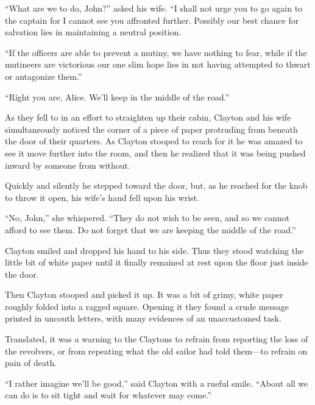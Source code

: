 “What are we to do, John?” asked his wife. “I shall not urge you to go again to the captain for I cannot see you affronted further. Possibly our best chance for salvation lies in maintaining a neutral position.

“If the officers are able to prevent a mutiny, we have nothing to fear, while if the mutineers are victorious our one slim hope lies in not having attempted to thwart or antagonize them.”

“Right you are, Alice. We’ll keep in the middle of the road.”

As they fell to in an effort to straighten up their cabin, Clayton and his wife simultaneously noticed the corner of a piece of paper protruding from beneath the door of their quarters. As Clayton stooped to reach for it he was amazed to see it move further into the room, and then he realized that it was being pushed inward by someone from without.

Quickly and silently he stepped toward the door, but, as he reached for the knob to throw it open, his wife’s hand fell upon his wrist.

“No, John,” she whispered. “They do not wish to be seen, and so we cannot afford to see them. Do not forget that we are keeping the middle of the road.”

Clayton smiled and dropped his hand to his side. Thus they stood watching the little bit of white paper until it finally remained at rest upon the floor just inside the door.

Then Clayton stooped and picked it up. It was a bit of grimy, white paper roughly folded into a ragged square. Opening it they found a crude message printed in uncouth letters, with many evidences of an unaccustomed task.

Translated, it was a warning to the Claytons to refrain from reporting the loss of the revolvers, or from repeating what the old sailor had told them—to refrain on pain of death.

“I rather imagine we’ll be good,” said Clayton with a rueful smile. “About all we can do is to sit tight and wait for whatever may come.”

\clearpage